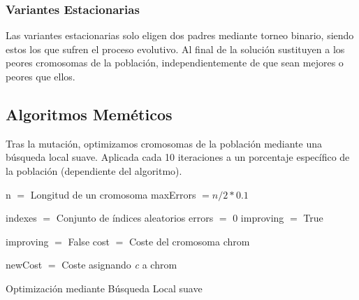\subsubsection{Variantes Estacionarias}

Las variantes estacionarias solo eligen dos padres mediante torneo binario, siendo estos los que sufren el proceso evolutivo. Al final de la solución sustituyen a los peores cromosomas de la población, independientemente de que sean mejores o peores que ellos.

\newpage


\subsection{Algoritmos Meméticos}

Tras la mutación, optimizamos cromosomas de la población mediante una búsqueda local suave. Aplicada cada 10 iteraciones a un porcentaje específico de la población (dependiente del algoritmo). \\

\begin{algorithm}[H]
    \SetAlgoLined
        n $=$ Longitud de un cromosoma \;
        maxErrors $= n/2 * 0.1$ \;
         {
            indexes $=$ Conjunto de índices aleatorios \;
            errors $=$ 0 \;
            improving $=$ True \;

             {

                improving $=$ False \;
                cost $=$ Coste del cromosoma chrom \;

                 {
                    newCost $=$ Coste asignando \textit{c} a chrom \;
                }

            }
        }
    \caption{Optimización mediante Búsqueda Local suave}
\end{algorithm}

